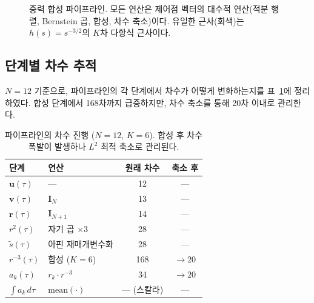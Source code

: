 \documentclass[11pt]{article}
\begin{document}
\begin{figure}[h]
\caption{중력 합성 파이프라인.
  모든 연산은 제어점 벡터의 대수적 연산(적분 행렬, Bernstein 곱, 합성, 차수 축소)이다.
  유일한 근사(회색)는 $h(s) = s^{-3/2}$의 $K$차 다항식 근사이다.}
\label{fig:pipeline}
\end{figure}

\subsection{단계별 차수 추적}

$N=12$ 기준으로, 파이프라인의 각 단계에서 차수가 어떻게 변화하는지를
표~\ref{tab:degree-tracking}에 정리하였다.
합성 단계에서 168차까지 급증하지만,
차수 축소를 통해 20차 이내로 관리한다.

\begin{table}[h]
\centering
\caption{파이프라인의 차수 진행 ($N=12$, $K=6$).
  합성 후 차수 폭발이 발생하나 $L^2$ 최적 축소로 관리된다.}
\label{tab:degree-tracking}
\small
\begin{tabular}{@{}llcc@{}}
\toprule
단계 & 연산 & 원래 차수 & 축소 후 \\
\midrule
$\mathbf{u}(\tau)$ & --- & 12 & --- \\
$\mathbf{v}(\tau)$ & $\mathbf{I}_N$ & 13 & --- \\
$\mathbf{r}(\tau)$ & $\mathbf{I}_{N+1}$ & 14 & --- \\
$r^2(\tau)$ & 자기 곱 $\times 3$ & 28 & --- \\
$\tilde{s}(\tau)$ & 아핀 재매개변수화 & 28 & --- \\
$r^{-3}(\tau)$ & 합성 ($K=6$) & 168 & $\to 20$ \\
$a_{k}(\tau)$ & $r_k \cdot r^{-3}$ & 34 & $\to 20$ \\
$\int a_k \, d\tau$ & $\mathrm{mean}(\cdot)$ & --- (스칼라) & --- \\
\bottomrule
\end{tabular}
\end{table}
\end{document}
